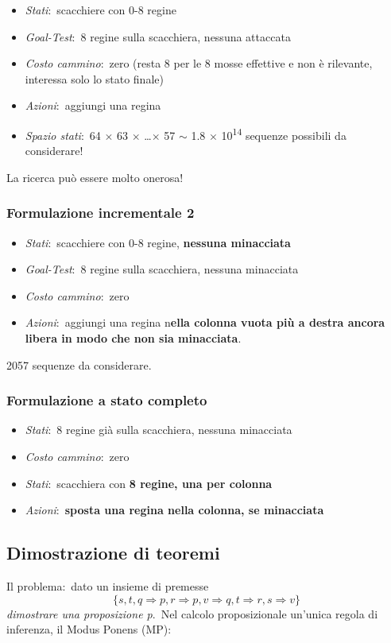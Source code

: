 \begin{itemize}
	\item \textit{Stati}:\ scacchiere con 0-8 regine
	\item \textit{Goal-Test}:\ 8 regine sulla scacchiera, nessuna attaccata
	\item \textit{Costo cammino}:\ zero (resta 8 per le 8 mosse effettive e non è rilevante, interessa solo lo stato finale)
	\item \textit{Azioni}:\ aggiungi una regina
	\item \textit{Spazio stati}:\ 64 $\times$ 63 $\times$ \dots $\times$ 57 $\sim$ 1.8 $\times$ 10\textsuperscript{14} sequenze possibili da considerare!
\end{itemize}
La ricerca può essere molto onerosa!

\subsubsection{Formulazione incrementale 2}
\begin{itemize}
	\item \textit{Stati}:\ scacchiere con 0-8 regine, \textbf{nessuna minacciata}
	\item \textit{Goal-Test}:\ 8 regine sulla scacchiera, nessuna minacciata
	\item \textit{Costo cammino}:\ zero
	\item \textit{Azioni}:\ aggiungi una regina n\textbf{ella colonna vuota più a destra ancora libera in modo che non sia minacciata}.
\end{itemize}
2057 sequenze da considerare.

\subsubsection{Formulazione a stato completo}
\begin{itemize}
	\item \textit{Stati}:\ 8 regine già sulla scacchiera, nessuna minacciata
	\item \textit{Costo cammino}:\ zero
	\item \textit{Stati}:\ scacchiera con \textbf{8 regine, una per colonna}
	\item \textit{Azioni}:\ \textbf{sposta una regina nella colonna, se minacciata}
\end{itemize}

\subsection{Dimostrazione di teoremi}
Il problema:\ dato un insieme di premesse
\[
	\{s, t, q \Rightarrow p, r \Rightarrow p, v \Rightarrow q, t \Rightarrow r, s \Rightarrow v\}
\]
\textit{dimostrare una proposizione p}.\
Nel calcolo proposizionale un'unica regola di inferenza, il Modus Ponens (MP):

